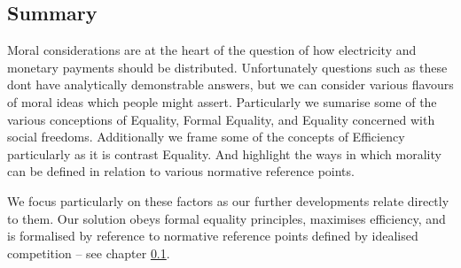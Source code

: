 \subsection{Summary}

Moral considerations are at the heart of the question of how electricity and monetary payments should be distributed.
Unfortunately questions such as these dont have analytically demonstrable answers, but we can consider various flavours of moral ideas which people might assert.
Particularly we sumarise some of the various conceptions of Equality, Formal Equality, and Equality concerned with social freedoms.
Additionally we frame some of the concepts of Efficiency particularly as it is contrast Equality.
And highlight the ways in which morality can be defined in relation to various normative reference points.

We focus particularly on these factors as our further developments relate directly to them.
Our solution obeys formal equality principles, maximises efficiency, and is formalised by reference to normative reference points defined by idealised competition -- see chapter \ref{}.




